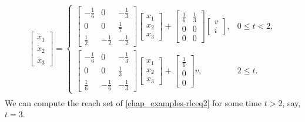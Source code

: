 \documentclass[letterpaper,10pt,english]{sphinxmanual}
\begin{document}
\label{chap_examples:equation-rlceq2}\begin{gather}
\begin{split}\left[\begin{array}{c}
\dot{x}_1\\
\dot{x}_2\\
\dot{x}_3\end{array}\right] = \left\{\begin{array}{ll}
\left[\begin{array}{ccc}
-\frac{1}{6} & 0 & -\frac{1}{3}\\
0 & 0 & \frac{1}{7}\\
\frac{1}{2} & -\frac{1}{2} & -\frac{1}{2}\end{array}\right]
\left[\begin{array}{c}
x_1\\
x_2\\
x_3\end{array}\right] + \left[\begin{array}{cc}
\frac{1}{6} & \frac{1}{3}\\
0 & 0\\
0 & 0\end{array}\right]\left[\begin{array}{c}
v\\
i\end{array}\right], & 0\leqslant t< 2, \\
\left[\begin{array}{ccc}
-\frac{1}{6} & 0 & -\frac{1}{3}\\
0 & 0 & \frac{1}{3}\\
\frac{1}{6} & -\frac{1}{6} & -\frac{1}{3}\end{array}\right]
\left[\begin{array}{c}
x_1\\
x_2\\
x_3\end{array}\right] + \left[\begin{array}{c}
\frac{1}{6} \\
0 \\
0 \end{array}\right]v, & 2\leqslant t. \end{array}\right.\end{split}\label{chap_examples-rlceq2}
\end{gather}
We can compute the reach set of \eqref{chap_examples-rlceq2} for some time \(t>2\),
say, \(t=3\).
\end{document}
